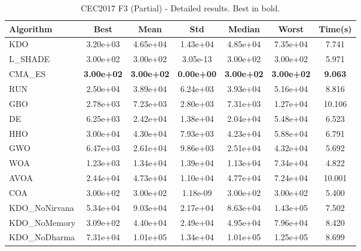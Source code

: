 \begin{table}[H]
\centering\small
\caption{CEC2017 F3 (Partial) - Detailed results. Best in bold.}
\label{tab:cec2017_F3}
\begin{tabular}{lcccccc}
\toprule
\textbf{Algorithm} & \textbf{Best} & \textbf{Mean} & \textbf{Std} & \textbf{Median} & \textbf{Worst} & \textbf{Time(s)} \\
\midrule
KDO & 3.20e+03 & 4.65e+04 & 1.43e+04 & 4.85e+04 & 7.35e+04 & 7.741 \\
L_SHADE & 3.00e+02 & 3.00e+02 & 3.05e-13 & 3.00e+02 & 3.00e+02 & 5.971 \\
CMA_ES & \textbf{3.00e+02} & \textbf{3.00e+02} & \textbf{0.00e+00} & \textbf{3.00e+02} & \textbf{3.00e+02} & \textbf{9.063} \\
RUN & 2.50e+04 & 3.89e+04 & 6.24e+03 & 3.93e+04 & 5.16e+04 & 8.816 \\
GBO & 2.78e+03 & 7.23e+03 & 2.80e+03 & 7.31e+03 & 1.27e+04 & 10.106 \\
DE & 6.25e+03 & 2.42e+04 & 1.38e+04 & 2.04e+04 & 5.48e+04 & 6.523 \\
HHO & 3.00e+04 & 4.30e+04 & 7.93e+03 & 4.23e+04 & 5.88e+04 & 6.791 \\
GWO & 6.47e+03 & 2.61e+04 & 9.86e+03 & 2.51e+04 & 4.32e+04 & 5.692 \\
WOA & 1.23e+03 & 1.34e+04 & 1.39e+04 & 1.13e+04 & 7.34e+04 & 4.822 \\
AVOA & 2.44e+04 & 4.73e+04 & 1.10e+04 & 4.77e+04 & 7.24e+04 & 10.001 \\
COA & 3.00e+02 & 3.00e+02 & 1.18e-09 & 3.00e+02 & 3.00e+02 & 5.400 \\
KDO_NoNirvana & 5.34e+04 & 9.03e+04 & 2.17e+04 & 8.63e+04 & 1.43e+05 & 7.502 \\
KDO_NoMemory & 3.09e+02 & 4.40e+04 & 2.49e+04 & 4.95e+04 & 7.96e+04 & 8.420 \\
KDO_NoDharma & 7.31e+04 & 1.01e+05 & 1.34e+04 & 1.01e+05 & 1.25e+05 & 8.699 \\
\bottomrule
\end{tabular}
\end{table}
